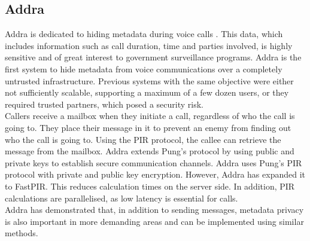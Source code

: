 \documentclass[a4paper]{article}
\begin{document}
\subsection{Addra}
Addra is dedicated to hiding metadata during voice calls \citep{Ahmad2021}. This data, which includes information such as call duration, time and parties involved, is highly sensitive and of great interest to government surveillance programs. Addra is the first system to hide metadata from voice communications over a completely untrusted infrastructure. Previous systems with the same objective were either not sufficiently scalable, supporting a maximum of a few dozen users, or they required trusted partners, which posed a security risk. \\
Callers receive a mailbox when they initiate a call, regardless of who the call is going to. They place their message in it to prevent an enemy from finding out who the call is going to. Using the PIR protocol, the callee can retrieve the message from the mailbox. 
Addra extends Pung's protocol by using public and private keys to establish secure communication channels. Addra uses Pung's PIR protocol with private and public key encryption. However, Addra has expanded it to FastPIR. This reduces calculation times on the server side. In addition, PIR calculations are parallelised, as low latency is essential for calls. \\
Addra has demonstrated that, in addition to sending messages, metadata privacy is also important in more demanding areas and can be implemented using similar methods. 
\end{document}
